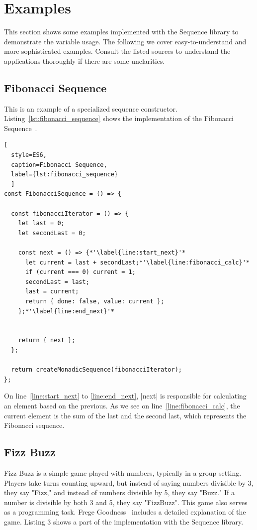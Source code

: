 \section{Examples} %
\label{sec:Examples}
This section shows some examples implemented with the
Sequence library to demonstrate the variable usage.
The following we cover easy-to-understand and more sophisticated
examples.  Consult the listed sources to understand the applications
thoroughly if there are some unclarities.

\subsection{Fibonacci Sequence}
\label{sub:Fibonacci Sequence}
This is an example of a specialized sequence constructor.
Listing~\ref{lst:fibonacci_sequence} shows the implementation of the Fibonacci 
Sequence~\cite[p.~36]{math_diskrete_2011}. 
\begin{lstlisting}[
  style=ES6, 
  caption=Fibonacci Sequence,
  label={lst:fibonacci_sequence}
  ]
const FibonacciSequence = () => {

  const fibonacciIterator = () => {
    let last = 0;
    let secondLast = 0;

    const next = () => {*'\label{line:start_next}'*
      let current = last + secondLast;*'\label{line:fibonacci_calc}'*
      if (current === 0) current = 1;
      secondLast = last;
      last = current;
      return { done: false, value: current };
    };*'\label{line:end_next}'*


    return { next };
  };

  return createMonadicSequence(fibonacciIterator);
};
\end{lstlisting}
On line~\ref{line:start_next} to \ref{line:end_next}, |next| is responsible for calculating an
element based on the previous. As we see on line~\ref{line:fibonacci_calc}, the current element is the
sum of the last and the second last, which represents the Fibonacci sequence.

\subsection{Fizz Buzz}
\label{sub:Fizz Buzz}
Fizz Buzz is a simple game played with numbers, typically in a group setting. Players
take turns counting upward, but instead of saying numbers divisible by 3, they
say "Fizz," and instead of numbers divisible by 5, they say "Buzz." If a number
is divisible by both 3 and 5, they say "FizzBuzz". This game also serves as a 
programming task.
\newline
Frege Goodness~\cite{frege_goodness} includes a detailed explanation of the game.
Listing 3 shows a part of the implementation with the Sequence library.

